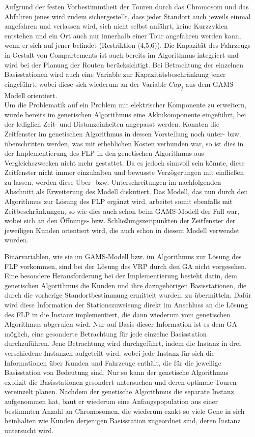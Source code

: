 \documentclass[a4paper,12pt,parskip,bibtotoc,liststotoc]{article}
\begin{document}
Aufgrund der festen Vorbestimmtheit der Touren durch das Chromosom und das Abfahren jenes wird zudem sichergestellt, dass jeder Standort auch jeweils einmal angefahren und verlassen wird, sich nicht selbst anfährt, keine Kurzzyklen entstehen und ein Ort auch nur innerhalb einer Tour angefahren werden kann, wenn er sich auf jener befindet (Restriktion (4,5,6)).
Die Kapazität des Fahrzeugs in Gestalt von Compartements ist auch bereits im Algorithmus integriert und wird bei der Planung der Routen berücksichtigt.
Bei Betrachtung der einzelnen Basisstationen wird auch eine Variable zur Kapazitätsbeschränkung jener eingeführt, wobei diese sich wiederum an der Variable $Cap_{j}$ aus dem GAMS-Modell orientiert.\\

Um die Problematik auf ein Problem mit elektrischer Komponente zu erweitern, wurde bereits im genetischen Algorithmus eine Akkukomponente eingeführt, bei der lediglich Zeit- und Distanzeinheiten angepasst werden.
Konnten die Zeitfenster im genetischen Algorithmus in dessen Vorstellung noch unter- bzw. überschritten werden, was mit erheblichen Kosten verbunden war, so ist dies in der Implementierung des FLP in den genetischen Algorithmus aus Vergleichszwecken nicht mehr gestattet. 
Da es jedoch sinnvoll sein könnte, diese Zeitfenster nicht immer einzuhalten und bewusste Verzögerungen mit einfließen zu lassen, werden diese Über- bzw. Unterschreitungen im nachfolgenden Abschnitt als Erweiterung des Modell diskutiert.
Das Modell, das nun durch den Algorithmus zur Lösung des FLP ergänzt wird, arbeitet somit ebenfalls mit Zeitbeschränkungen, so wie dies auch schon beim GAMS-Modell der Fall war, wobei sich an den Öffnungs- bzw. Schließungszeitpunkten der Zeitfenster der jeweiligen Kunden orientiert wird, die auch schon in diesem Modell verwendet wurden.

Binärvariablen, wie sie im GAMS-Modell bzw. im Algorithmus zur Lösung des FLP vorkommen, sind bei der Lösung des VRP durch den GA nicht vorgesehen.
Eine besondere Herausforderung bei der Implementierung besteht darin, dem genetischen Algorithmus die Kunden und ihre dazugehörigen Basisstationen, die durch die vorherige Standortbestimmung ermittelt wurden, zu übermitteln.
Dafür wird diese Information der Stationszuweisung direkt im Anschluss an die Lösung des FLP in die Instanz implementiert, die dann wiederum vom genetischen Algorithmus abgerufen wird.
Nur auf Basis dieser Information ist es dem GA möglich, eine gesonderte Betrachtung für jede einzelne Basisstation durchzuführen.
Jene Betrachtung wird durchgeführt, indem die Instanz in drei verschiedene Instanzen aufgeteilt wird, wobei jede Instanz für sich die Informationen über Kunden und Fahrzeuge enthält, die für die jeweilige Basisstation von Bedeutung sind.
Nur so kann der genetische Algorithmus explizit die Basisstationen gesondert untersuchen und deren optimale Touren vereinzelt planen. 
Nachdem der genetische Algorithmus die separate Instanz aufgenommen hat, baut er wiederum eine Anfangspopulation aus einer bestimmten Anzahl an Chromosomen, die wiederum exakt so viele Gene in sich beinhalten wie Kunden derjenigen Basisstation zugeordnet sind, deren Instanz untersucht wird.
\end{document}
